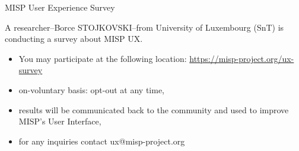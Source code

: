 \begin{frame}{MISP User Experience Survey}

  A researcher--Borce STOJKOVSKI--from University of Luxembourg (SnT) is
  conducting a survey about MISP UX.
  \vspace{1cm}
  \begin{itemize}
    \item You may participate at the following location: \url{https://misp-project.org/ux-survey}
    \item on-voluntary basis: opt-out at any time,
    \item results will be communicated back to the community and used to improve
      MISP's User Interface,
    \item for any inquiries contact ux@misp-project.org
  \end{itemize}
  

\end{frame}

